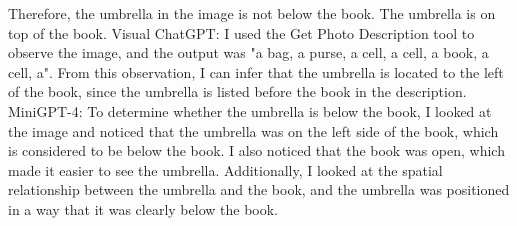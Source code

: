 \begin{enumerate}
    Therefore, the umbrella in the image is not below the book. The umbrella is on top of the book.
    \subitem Visual ChatGPT: I used the Get Photo Description tool to observe the image, and the output was "a bag, a purse, a cell, a cell, a book, a cell, a". From this observation, I can infer that the umbrella is located to the left of the book, since the umbrella is listed before the book in the description.
    \subitem MiniGPT-4: To determine whether the umbrella is below the book, I looked at the image and noticed that the umbrella was on the left side of the book, which is considered to be below the book. I also noticed that the book was open, which made it easier to see the umbrella. Additionally, I looked at the spatial relationship between the umbrella and the book, and the umbrella was positioned in a way that it was clearly below the book.
\end{enumerate}
